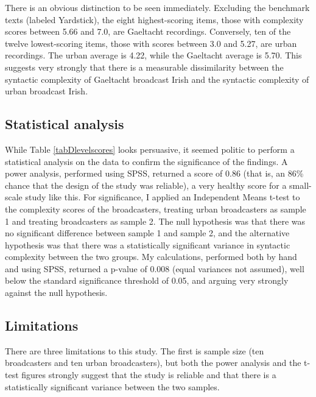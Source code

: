 \documentclass[output=paper,colorlinks,citecolor=brown]{langscibook}
\begin{document}
There is an obvious distinction to be seen immediately. Excluding the benchmark texts (labeled Yardstick), the eight highest-scoring items, those with complexity scores between 5.66 and 7.0, are Gaeltacht recordings. Conversely, ten of the twelve lowest-scoring items, those with scores between 3.0 and 5.27, are urban recordings. The urban average is 4.22, while the Gaeltacht average is 5.70. This suggests very strongly that there is a measurable dissimilarity between the syntactic complexity of Gaeltacht broadcast Irish and the syntactic complexity of urban broadcast Irish.

\subsection{Statistical analysis}

While Table \ref{tabDlevelscores} looks persuasive, it seemed politic to perform a statistical analysis on the data to confirm the significance of the findings. A power analysis, performed using SPSS, returned a score of 0.86 (that is, an 86\% chance that the design of the study was reliable), a very healthy score for a small-scale study like this. For significance, I applied an Independent Means t-test to the complexity scores of the broadcasters, treating urban broadcasters as sample 1 and treating  broadcasters as sample 2. The null hypothesis was that there was no significant difference between sample 1 and sample 2, and the alternative hypothesis was that there was a statistically significant variance in syntactic complexity between the two groups. My calculations, performed both by hand and using SPSS, returned a p-value of 0.008 (equal variances not assumed), well below the standard significance threshold of 0.05, and arguing very strongly against the null hypothesis.

\subsection{Limitations}

There are three limitations to this study. The first is sample size (ten  broadcasters and ten urban broadcasters), but both the power analysis and the t-test figures strongly suggest that the study is reliable and that there is a statistically significant variance between the two samples.
\end{document}
